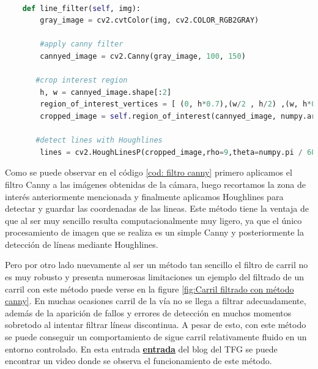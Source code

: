   
\begin{code}[H]
	\begin{lstlisting}[language=Python]
	
    def line_filter(self, img):
        gray_image = cv2.cvtColor(img, cv2.COLOR_RGB2GRAY)
        
        #apply canny filter
        cannyed_image = cv2.Canny(gray_image, 100, 150)
       
       #crop interest region
        h, w = cannyed_image.shape[:2]
        region_of_interest_vertices = [ (0, h*0.7),(w/2 , h/2) ,(w, h*0.7), ]
        cropped_image = self.region_of_interest(cannyed_image, numpy.array([region_of_interest_vertices], numpy.int32))
        
       #detect lines with Houghlines
        lines = cv2.HoughLinesP(cropped_image,rho=9,theta=numpy.pi / 60, threshold=50,lines=numpy.array([]),minLineLength=20,maxLineGap=25)
	\end{lstlisting}
\caption[Implementación de filtro canny ]{Filtro canny}
\label{cod: filtro canny}
\end{code}
  
Como se puede observar en el código \ref{cod: filtro canny} primero aplicamos el filtro Canny a las imágenes obtenidas de la cámara, luego recortamos la zona de interés anteriormente mencionada y finalmente aplicamos Houghlines para detectar y guardar las coordenadas de las lineas. Este método tiene la ventaja de que al ser muy sencillo resulta computacionalmente muy ligero, ya que el único procesamiento de imagen que se realiza es un simple Canny y posteriormente la detección de líneas mediante Houghlines.

\bigskip

Pero por otro lado nuevamente al ser un método tan sencillo el filtro de carril no es muy robusto y presenta numerosas limitaciones un ejemplo del filtrado de un carril con este método puede verse en la figure \ref{fig:Carril filtrado con método canny}. En muchas ocasiones carril de la vía no se llega a filtrar adecuadamente, además de la aparición de fallos y errores de detección en muchos momentos sobretodo al intentar filtrar líneas discontinua. A pesar de esto, con este método se puede conseguir un comportamiento de sigue carril relativamente fluido en un entorno controlado. En esta entrada \href{https://roboticslaburjc.github.io/2022-tfg-juancamilo-carmona/DEMOS/}{\textbf{entrada}} del blog del \ac{TFG} se puede encontrar un video donde se observa el funcionamiento de este método.

